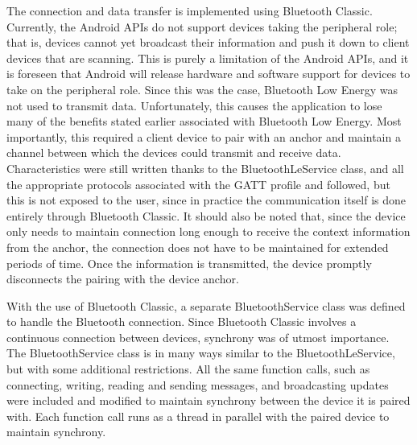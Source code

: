 \documentclass{sig-alternate}
\begin{document}
The connection and data transfer is implemented using Bluetooth
Classic. Currently, the Android APIs do not support devices
taking the peripheral role; that is, devices cannot yet broadcast
their information and push it down to client devices that are
scanning. This is purely a limitation of the Android APIs, and
it is foreseen that Android will release hardware and software
support for devices to take on the peripheral role. Since
this was the case, Bluetooth Low Energy was not used to
transmit data. Unfortunately, this causes the application to lose
many of the benefits stated earlier associated with Bluetooth
Low Energy. Most importantly, this required a client device 
to pair with an anchor and maintain a channel between which
the devices could transmit and receive data. Characteristics
were still written thanks to the BluetoothLeService class, and
all the appropriate protocols associated with the GATT profile
and followed, but this is not exposed to the user, since in practice
the communication itself is done entirely through Bluetooth
Classic. It should also be noted that, since the device only needs
to maintain connection long enough to receive the context information
from the anchor, the connection does not have to be maintained
for extended periods of time. Once the information is transmitted,
the device promptly disconnects the pairing with the device anchor. 

With the use of Bluetooth Classic, a separate BluetoothService class
was defined to handle the Bluetooth connection. 
Since Bluetooth Classic involves a continuous connection between 
devices, synchrony was of utmost importance. The BluetoothService
class is in many ways similar to the BluetoothLeService, but with
some additional restrictions. All the same function calls, such as
connecting, writing, reading and sending messages, and broadcasting
updates were included and modified to maintain synchrony between
the device it is paired with. Each function call runs as a thread in
parallel with the paired device to maintain synchrony.
\end{document}
